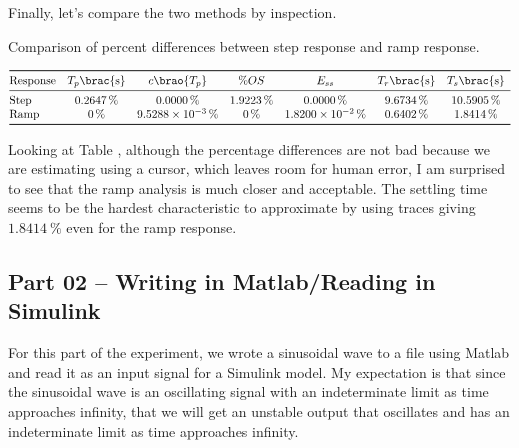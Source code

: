 \documentclass[12pt]{article}
\DeclarePairedDelimiter\brao()%
\DeclarePairedDelimiter\brac[]%
\begin{document}
Finally, let's compare the two methods by inspection.

\begin{table}[h]
    \centering
    \caption{Comparison of percent differences between step response and ramp response.}
	\[
		\begin{array}{@{}l*7S@{}}
		\toprule
			\text{Response} & T_p \brac{\si\second} & c\brao{T_p} & \si\percent OS & \text{$E_{ss}$} & T_r \brac{\si\second} & T_s \brac{\si\second}
		\\*
		\midrule
			\text{Step} & \SI{0.2647}\percent & \SI{0.0000}\percent & \SI{1.9223}\percent & \SI{0.0000}\percent & \SI{9.6734}\percent & \SI{10.5905}\percent
        \\*
			\text{Ramp} & \SI{0.}\percent & \SI{9.5288e-03}\percent & \SI{0.}\percent & \SI{1.8200e-02}\percent & \SI{0.6402}\percent & \SI{1.8414}\percent
		\\*
		\bottomrule
		\end{array}
	\]
    \label{tab:comparison of methods}
\end{table}

Looking at Table \label{tab:comparison of methods},
although the percentage differences are not bad because we are estimating using a cursor, which leaves room for human error,
I am surprised to see that the ramp analysis is much closer and acceptable.
The settling time seems to be the hardest characteristic to approximate by using traces giving $\SI{1.8414}\percent$ even for the ramp response.

\subsection{Part 02 -- Writing in Matlab/Reading in Simulink}\label{ssc: I/O using matlab and simulink}

For this part of the experiment, we wrote a sinusoidal wave to a file using Matlab and read it as an input signal for a Simulink model.
My expectation is that since the sinusoidal wave is an oscillating signal with an indeterminate limit as time approaches infinity, that we will get an unstable output that oscillates and has an indeterminate limit as time approaches infinity.
\end{document}
